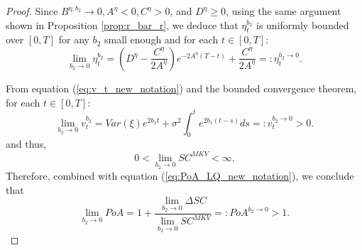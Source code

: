 \documentclass[11pt]{article}
\begin{document}
\begin{proof}
	
	Since $B^{\eta,b_2} \to 0, A^{\eta} < 0, C^{\eta} >0$, and $D^{\eta} \geq 0$, using the same argument shown in Proposition \ref{prop:r_bar_r}, 
	we deduce that $\eta_t^{b_2}$ is uniformly bounded over $[0,T]$ for any $b_2$ small enough and for each $t \in[0,T]$:
	$$\lim_{b_2 \to 0}\eta_t^{b_2}=\left(D^{\eta} - \frac{C^{\eta}}{2A^\eta}\right) e^{-2A^\eta(T-t)} + \frac{C^\eta}{2A^{\eta} }=:\eta_t^{b_2 \to 0}.$$
	
	From equation (\ref{eq:v_t_new_notation}) and the bounded convergence theorem, for each $t \in [0,T]$:
	$$ \lim_{b_2 \to 0}v_t^{b_2}=Var(\xi) e^{2b_1 t} + \sigma^2 \int_0^t e^{2b_1 (t-s)} ds=:v_t^{b_2 \to 0}>0.$$
	and thus,
	$$ 0 < \lim_{b_2 \to 0} SC^{MKV} < \infty.$$
	Therefore, combined with equation (\ref{eq:PoA_LQ_new_notation}), we conclude that $$\lim_{b_2 \to 0} PoA = 1 + \frac{\displaystyle \lim_{b_2 \to 0}\Delta SC}{\displaystyle \lim_{b_2 \to 0} SC^{MKV} } =: PoA^{b_2 \to 0} > 1.$$
	
\end{proof}
\end{document}
